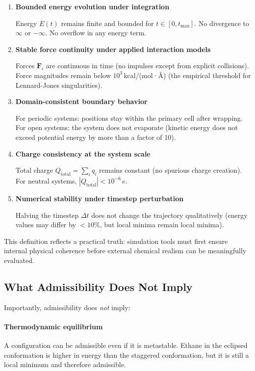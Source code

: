 \documentclass[11pt]{article}
\begin{document}
\begin{enumerate}
\item \textbf{Bounded energy evolution under integration}

Energy $E(t)$ remains finite and bounded for $t \in [0, t_{\text{max}}]$. No divergence to $\infty$ or $-\infty$. No overflow in any energy term.

\item \textbf{Stable force continuity under applied interaction models}

Forces $\mathbf{F}_i$ are continuous in time (no impulses except from explicit collisions). Force magnitudes remain below $10^3$\,kcal/(mol·Å) (the empirical threshold for Lennard-Jones singularities).

\item \textbf{Domain-consistent boundary behavior}

For periodic systems: positions stay within the primary cell after wrapping.
For open systems: the system does not evaporate (kinetic energy does not exceed potential energy by more than a factor of 10).

\item \textbf{Charge consistency at the system scale}

Total charge $Q_{\text{total}} = \sum_i q_i$ remains constant (no spurious charge creation). For neutral systems, $|Q_{\text{total}}| < 10^{-6}\,e$.

\item \textbf{Numerical stability under timestep perturbation}

Halving the timestep $\Delta t$ does not change the trajectory qualitatively (energy values may differ by $<10\%$, but local minima remain local minima).
\end{enumerate}

This definition reflects a practical truth: simulation tools must first ensure internal physical coherence before external chemical realism can be meaningfully evaluated.

\subsection{What Admissibility Does Not Imply}

Importantly, admissibility does \textit{not} imply:

\paragraph{Thermodynamic equilibrium} A configuration can be admissible even if it is metastable. Ethane in the eclipsed conformation is higher in energy than the staggered conformation, but it is still a local minimum and therefore admissible.
\end{document}
